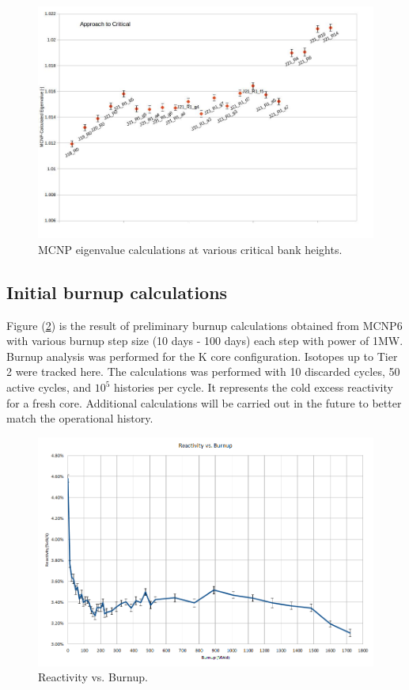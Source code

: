 \documentclass{UWNR_modeling}
\begin{document}
\begin{figure}[t!]
  \centering
  \includegraphics[width=6in]{atc_run_1229.jpg}
  \caption{MCNP eigenvalue calculations at various critical bank heights.}
  \label{fig:atc}
\end{figure}

\subsection{Initial burnup calculations}
Figure (\ref{fig:burnup_reactivity}) is the result of preliminary burnup calculations obtained from MCNP6 with various burnup step size (10 days - 100 days) each step with power of 1MW. Burnup analysis was performed for the K core configuration. Isotopes up to Tier 2 were tracked here. The calculations was performed with 10 discarded cycles, 50 active cycles, and $10^{5}$ histories per cycle. It represents the cold excess reactivity for a fresh core.  Additional calculations will be carried out in the future to better match the operational history.

\begin{figure}[H]
  \centering
  \includegraphics[width=6in]{burnup_fig.png}
  \caption{Reactivity vs. Burnup.}
  \label{fig:burnup_reactivity}
\end{figure}
\end{document}
